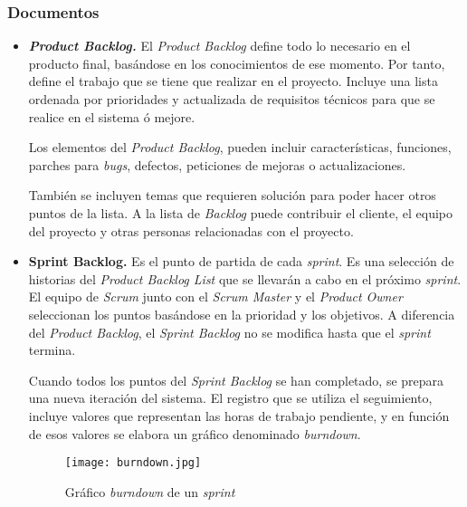 \subsubsection{Documentos}
\begin{itemize}
\item \textbf{\textit{Product Backlog.}} El \textit{Product Backlog} define todo lo necesario en el producto final, basándose en los conocimientos de ese momento. Por tanto, define el trabajo que se tiene que realizar en el proyecto. Incluye una lista ordenada por prioridades y actualizada de requisitos técnicos para que se realice en  el sistema ó mejore. 

Los elementos del \textit{Product Backlog}, pueden incluir características, funciones, parches para \textit{bugs}, defectos, peticiones de mejoras o actualizaciones.
 
También se incluyen temas que requieren solución para poder hacer otros puntos de la lista. A la lista de \textit{Backlog} puede contribuir el cliente, el equipo del proyecto y otras personas relacionadas con el proyecto.

\item \textbf{Sprint Backlog.} Es el punto de partida de cada \textit{sprint}. Es una selección de historias del \textit{Product Backlog List} que se llevarán a cabo en el próximo \textit{sprint}. El equipo de \textit{Scrum} junto con el \textit{Scrum Master} y el \textit{Product Owner} seleccionan los puntos basándose en la prioridad y los objetivos. A diferencia del \textit{Product Backlog}, el \textit{Sprint Backlog} no se modifica hasta que el \textit{sprint} termina.
 
Cuando todos los puntos del \textit{Sprint Backlog} se han completado, se prepara una nueva iteración del sistema. El registro que se utiliza el seguimiento, incluye valores que representan las horas de trabajo pendiente, y en función de esos valores se elabora un gráfico denominado \textit{burndown}.

\begin{figure}[h] 
  \centering
  \texttt{[image: burndown.jpg]}
  \caption{Gráfico \textit{burndown} de un \textit{sprint}}
  \label{fig:burndown}
\end{figure}

\end{itemize}

